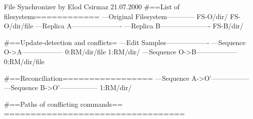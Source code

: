 File Synchronizer 
  by Elod Csirmaz 21.07.2000
#==List of filesystems============
---Original Filesystem------------
FS-O/dir/
FS-O/dir/file
---Replica A----------------------
---Replica B----------------------
FS-B/dir/

#==Update-detection and conflicts=
---Edit Samples-------------------
---Sequence O->A------------------
0:RM/dir/file 
1:RM/dir/ 
---Sequence O->B------------------
0:RM/dir/file 

#==Reconciliation=================
---Sequence A->O'-----------------
---Sequence B->O'-----------------
1:RM/dir/

#==Paths of conflicting commands==
==================================

